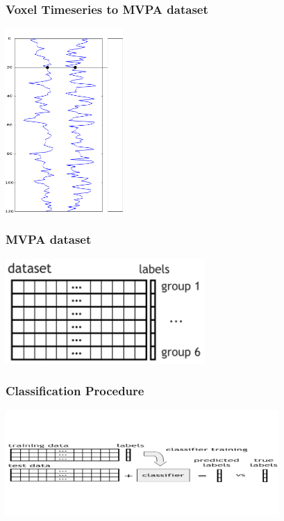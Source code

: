 \documentclass{beamer}
\begin{document}
  \begin{frame}
    \frametitle{Voxel Timeseries to MVPA dataset}
        \begin{center}
            \includegraphics[height=7cm]{../pictures/time_series2dataset}
        \end{center}
    \end{frame}

  \begin{frame}
    \frametitle{MVPA dataset}
        \begin{center}
            \includegraphics[height=4cm]{../pictures/mvpa_dataset}
        \end{center}
    \end{frame}

  \begin{frame}
    \frametitle{Classification Procedure}
        \begin{center}
            \includegraphics[height=4cm]{../pictures/classification_procedure}
        \end{center}
    \end{frame}
    
\end{document}
